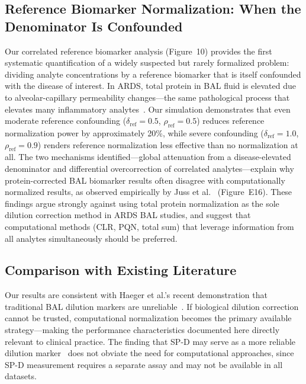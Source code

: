 \documentclass[12pt]{article}
\begin{document}
\subsection{Reference Biomarker Normalization: When the Denominator Is Confounded}

Our correlated reference biomarker analysis (Figure~10) provides the first systematic quantification of a widely suspected but rarely formalized problem: dividing analyte concentrations by a reference biomarker that is itself confounded with the disease of interest. In ARDS, total protein in BAL fluid is elevated due to alveolar-capillary permeability changes---the same pathological process that elevates many inflammatory analytes~\cite{Matthay2019}. Our simulation demonstrates that even moderate reference confounding ($\delta_{\text{ref}} = 0.5$, $\rho_{\text{ref}} = 0.5$) reduces reference normalization power by approximately 20\%, while severe confounding ($\delta_{\text{ref}} = 1.0$, $\rho_{\text{ref}} = 0.9$) renders reference normalization less effective than no normalization at all. The two mechanisms identified---global attenuation from a disease-elevated denominator and differential overcorrection of correlated analytes---explain why protein-corrected BAL biomarker results often disagree with computationally normalized results, as observed empirically by Juss et al.~\cite{Juss2016} (Figure~E16). These findings argue strongly against using total protein normalization as the sole dilution correction method in ARDS BAL studies, and suggest that computational methods (CLR, PQN, total sum) that leverage information from all analytes simultaneously should be preferred.

\subsection{Comparison with Existing Literature}

Our results are consistent with Haeger et al.'s recent demonstration that traditional BAL dilution markers are unreliable~\cite{Haeger2024}. If biological dilution correction cannot be trusted, computational normalization becomes the primary available strategy---making the performance characteristics documented here directly relevant to clinical practice. The finding that SP-D may serve as a more reliable dilution marker~\cite{Haeger2024,Chakrabarti2022} does not obviate the need for computational approaches, since SP-D measurement requires a separate assay and may not be available in all datasets.
\end{document}
